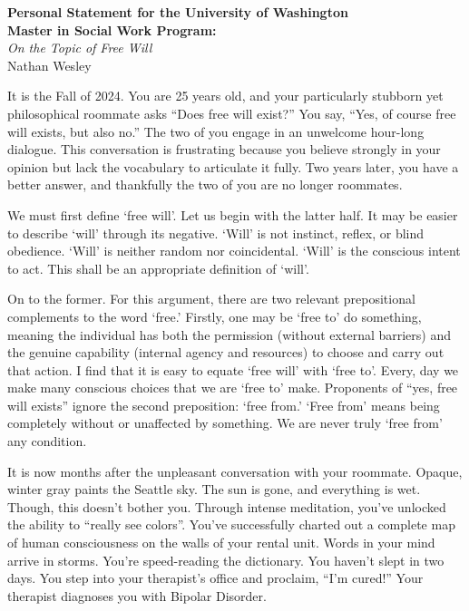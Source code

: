 \documentclass[12pt,letterpaper]{article}
\begin{document}
\doublespacing

\begin{center}
    \textbf{Personal Statement for the University of Washington}\\
    \textbf{Master in Social Work Program:}\\
    \textit{On the Topic of Free Will}\\
    Nathan Wesley
\end{center}

It is the Fall of 2024. You are 25 years old, and your particularly stubborn yet philosophical roommate asks “Does free will exist?” You say, “Yes, of course free will exists, but also no.” The two of you engage in an unwelcome hour-long dialogue. This conversation is frustrating because you believe strongly in your opinion but lack the vocabulary to articulate it fully. Two years later, you have a better answer, and thankfully the two of you are no longer roommates.

We must first define ‘free will’. Let us begin with the latter half. It may be easier to describe ‘will’ through its negative. ‘Will’ is not instinct, reflex, or blind obedience. ‘Will’ is neither random nor coincidental. ‘Will’ is the conscious intent to act. This shall be an appropriate definition of ‘will’.

On to the former. For this argument, there are two relevant prepositional complements to the word ‘free.’ Firstly, one may be ‘free to’ do something, meaning the individual has both the permission (without external barriers) and the genuine capability (internal agency and resources) to choose and carry out that action. I find that it is easy to equate ‘free will’ with ‘free to’. Every, day we make many conscious choices that we are ‘free to’ make. Proponents of “yes, free will exists” ignore the second preposition: ‘free from.’ ‘Free from’ means being completely without or unaffected by something. We are never truly ‘free from’ any condition.

It is now months after the unpleasant conversation with your roommate. Opaque, winter gray paints the Seattle sky. The sun is gone, and everything is wet. Though, this doesn’t bother you. Through intense meditation, you’ve unlocked the ability to “really see colors”. You’ve successfully charted out a complete map of human consciousness on the walls of your rental unit. Words in your mind arrive in storms. You’re speed-reading the dictionary. You haven’t slept in two days. You step into your therapist’s office and proclaim, “I’m cured!” Your therapist diagnoses you with Bipolar Disorder.
\end{document}
